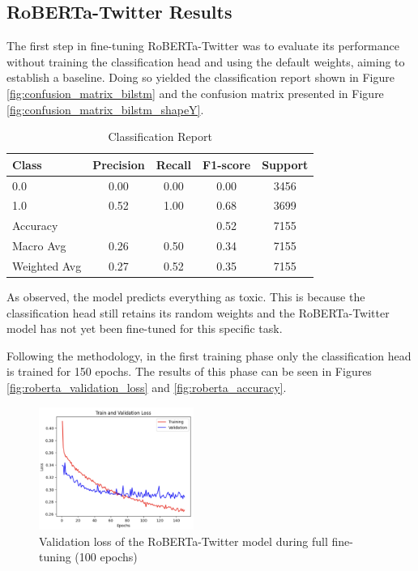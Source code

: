 \subsection{RoBERTa-Twitter Results}

The first step in fine-tuning RoBERTa-Twitter was to evaluate its performance without training the classification head and using the default weights, aiming to establish a baseline. Doing so yielded the classification report shown in Figure \ref{fig:confusion_matrix_bilstm} and the confusion matrix presented in Figure \ref{fig:confusion_matrix_bilstm_shapeY}.

\begin{table}[H]
\centering
\caption{Classification Report}
\label{tab:classification_report}
\begin{tabular}{lcccc}
\toprule
Class        & Precision & Recall & F1-score & Support \\
\midrule
0.0          & 0.00      & 0.00   & 0.00     & 3456    \\
1.0          & 0.52      & 1.00   & 0.68     & 3699    \\
\midrule
Accuracy     &           &        & 0.52     & 7155    \\
Macro Avg    & 0.26      & 0.50   & 0.34     & 7155    \\
Weighted Avg & 0.27      & 0.52   & 0.35     & 7155    \\
\bottomrule
\end{tabular}
\end{table}

As observed, the model predicts everything as toxic. This is because the classification head still retains its random weights and the RoBERTa-Twitter model has not yet been fine-tuned for this specific task.

Following the methodology, in the first training phase only the classification head is trained for 150 epochs. The results of this phase can be seen in Figures \ref{fig:roberta_validation_loss} and \ref{fig:roberta_accuracy}.


\begin{figure}[H]
    \centering
    \includegraphics[width=0.45\textwidth]{images/robertaValidationLossFigureX15Epoch.png}
    \caption{Validation loss of the RoBERTa-Twitter model during full fine-tuning (100 epochs)}
    \label{fig:roberta_validation_loss_finetune}
\end{figure}

